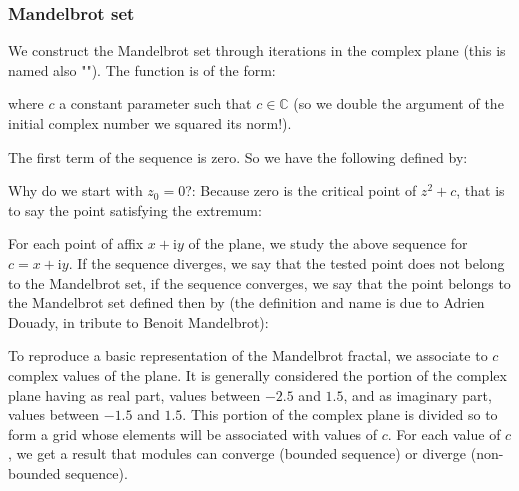 	\subsubsection{Mandelbrot set}
	We construct the Mandelbrot set through iterations in the complex plane (this is named also ""). The function is of the form:
	
	where $c$ a constant parameter such that $c\in\mathbb{C}$ (so we double the argument of the initial complex number we squared its norm!).
	
	The first term of the sequence is zero. So we have the following defined by:
	
	Why do we start with $z_0=0$?: Because zero is the critical point of $z^2+c$, that is to say the point satisfying the extremum:
	
	For each point of affix $x + \mathrm{i}y$ of the plane, we study the above sequence for $c=x+\mathrm{i}y$. If the sequence diverges, we say that the tested point does not belong to the Mandelbrot set, if the sequence converges, we say that the point belongs to the Mandelbrot set defined then by (the definition and name is due to Adrien Douady, in tribute to Benoit Mandelbrot):
	
	
	To reproduce a basic representation of the Mandelbrot fractal, we associate to $c$ complex values of the plane. It is generally considered the portion of the complex plane having as real part, values between $-2.5$ and $1.5$, and as imaginary part, values between $-1.5$ and $1.5$. This portion of the complex plane is divided so to form a grid whose elements will be associated with values of $c$. For each value of $c$, we get a result that modules can converge (bounded sequence) or diverge (non-bounded sequence).
	
